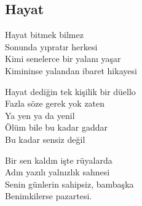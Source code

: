 \subsection{Hayat}

Hayat bitmek bilmez \\
Sonunda yıpratır herkesi \\
Kimi senelerce bir yalanı yaşar \\
Kimininse yalandan ibaret hikayesi

\noindent\newline
Hayat dediğin tek kişilik bir düello \\
Fazla söze gerek yok zaten \\
Ya yen ya da yenil \\
Ölüm bile bu kadar gaddar \\
Bu kadar sensiz değil

\noindent\newline
Bir sen kaldın işte rüyalarda \\
Adın yazılı yalnızlık sahnesi \\
Senin günlerin sahipsiz, bambaşka \\
Benimkilerse pazartesi.